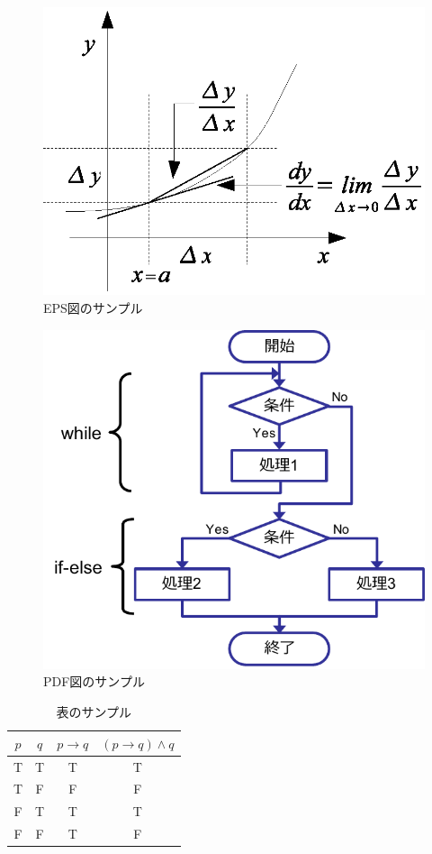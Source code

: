 \documentclass[a4paper, 9pt]{jarticle}
\begin{document}
\begin{論文概要}
\begin{figure}[ht]
\centering
\includegraphics[width=0.9\columnwidth,clip]{2-1.eps}
\caption{EPS図のサンプル}
\label{fig:sample1}
\end{figure}

\begin{figure}[ht]
\centering
\includegraphics[scale=0.6,clip]{2-2.pdf}
\caption{PDF図のサンプル}
\label{fig:sample2}
\end{figure}

\begin{table}[ht]
\centering
\caption{表のサンプル}
\label{tbl:sample1}
\begin{tabular}{|c|c||c|c|} \hline
$p$ & $q$ & $p\rightarrow q$ & $(p\rightarrow q)\wedge q$ \\ \hline
T & T & T & T \\ \hline
T & F & F & F \\ \hline
F & T & T & T \\ \hline
F & F & T & F \\ \hline
\end{tabular}
\end{table}


\end{論文概要}
\end{document}
